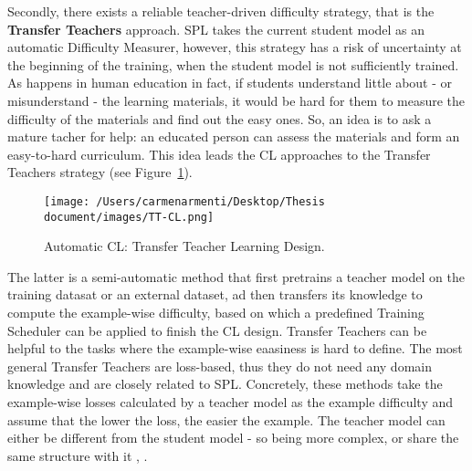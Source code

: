Secondly, there exists a reliable teacher-driven difficulty strategy, that is the \textbf{Transfer Teachers} approach.
SPL takes the current student model as an automatic Difficulty Measurer, however, this strategy has a risk of uncertainty at the beginning of the training, when the student model
is not sufficiently trained. As happens in human education in fact, if students understand 
little about - or misunderstand - the learning materials, it would be hard for them to measure the difficulty of the materials 
and find out the easy ones. So, an idea is to ask a mature tacher for help: an educated person can assess
the materials and form an easy-to-hard curriculum. This idea leads the CL approaches to the Transfer Teachers strategy (see Figure~\ref{fig:TT-CL}).
\begin{figure}[h]
    \begin{center}
        \texttt{[image: /Users/carmenarmenti/Desktop/Thesis document/images/TT-CL.png]}
        \caption{\label{fig:TT-CL}Automatic CL: Transfer Teacher Learning Design.}
    \end{center}
\end{figure}
The latter is a semi-automatic method that first pretrains a teacher model on the training datasat or an external dataset, ad then transfers its knowledge
to compute the example-wise difficulty, based on which a predefined Training Scheduler can be applied to finish the CL design. 
Transfer Teachers can be helpful to the tasks where the example-wise eaasiness is hard to define.
The most general Transfer Teachers are loss-based, thus they do not need any domain knowledge and are closely related 
to SPL. Concretely, these methods take the example-wise losses calculated by a teacher model as the example difficulty 
and assume that the lower the loss, the easier the example. The teacher model can either be different 
from the student model \cite{weinshall2018curriculum} - so being more complex, or share the same structure with it \cite{hacohen2019power}, \cite{xu2020curriculum}.

